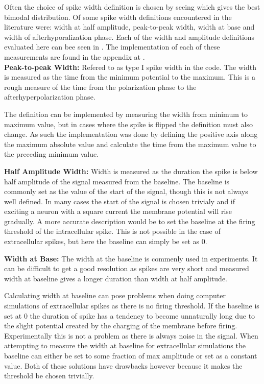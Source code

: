 \documentclass[altfont, fleqn]{uiophd}
\renewcommand{\cref}[1]{{\color{viridis_03}\mycref{#1}}}
\begin{document}
Often the choice of spike width definition is chosen by
seeing which gives the best bimodal distribution. 
Of some spike width definitions encountered in the literature 
were:
width at half amplitude, 
peak-to-peak width, 
width at base
and 
width of afterhyporalization phase. 
Each of the width and amplitude definitions evaluated here
can bee seen in \cref{fig:3_ap_eap}.
The implementation of each of these measurements are found in the appendix at
\cref{sec:frequent_functions}.
\\

\noindent 
{\bf Peak-to-peak Width:} 
Refered to as type I spike width in the code. 
The width is measured as the time from the minimum potential to the maximum. 
This is a rough measure of the time from the polarization phase to 
the afterhyperpolarization phase. 

The definition can be implemented by measuring the width from
minimum to maximum value, but in cases where the spike is flipped
the definition must also change. 
As such the implementation was done by defining the positive axis along 
the maximum absolute value and calculate the time from 
the maximum value to the preceding minimum value.
\newline


\noindent 
{\bf Half Amplitude Width:} 
Width is measured as the duration the spike is below half amplitude of the 
signal measured from the baseline.
The baseline is commonly set as the value of the start of the signal, 
though this is not always well defined. 
In many cases the start of the signal is chosen trivialy
and if exciting a neuron with a square current the membrane potential will 
rise gradually. 
A more accurate description would be to set the baseline at the firing 
threshold of 
the intracellular spike. 
This is not possible in the case of extracellular spikes,
but here the baseline can simply be set as 0. 
\newline

\noindent 
{\bf Width at Base:} 
The width at the baseline is commenly used in experiments.
It can be difficult to get a good resolution as spikes are very short
and measured width at baseline gives a longer duration than width at half 
amplitude. 

Calculating width at baseline can pose problems when doing computer simulations
of extracellular spikes as there is no firing threshold. 
If the baseline is set at 0 the duration of spike has a tendency to become 
unnaturally long due to the slight potential created by the charging
of the membrane before firing. 
Experimentally this is not a problem as there is always noise
in the signal. 
When attempting to measure 
the width at baseline for extracellular simulations
the baseline can either be set to some fraction of max amplitude
or set as a constant value. 
Both of these solutions have drawbacks however because 
it makes the threshold be chosen trivially. 
\newline
\end{document}
